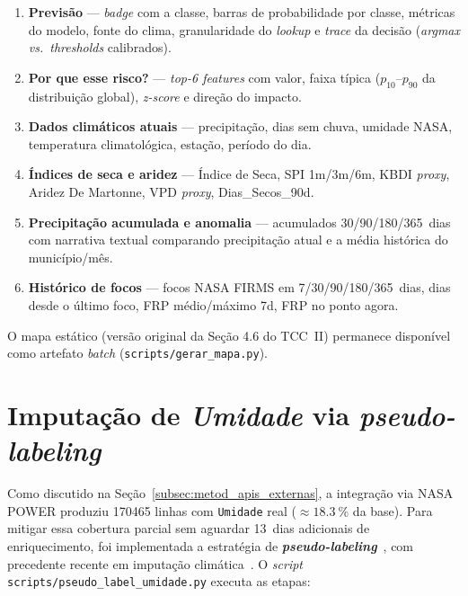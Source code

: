 \begin{enumerate}
  \item \textbf{Previsão} --- \emph{badge} com a classe, barras de probabilidade por classe, métricas do modelo, fonte do clima, granularidade do \emph{lookup} e \emph{trace} da decisão (\emph{argmax} \emph{vs.}\ \emph{thresholds} calibrados).
  \item \textbf{Por que esse risco?} --- \emph{top-6 features} com valor, faixa típica (\(p_{10}\)--\(p_{90}\) da distribuição global), \emph{z-score} e direção do impacto.
  \item \textbf{Dados climáticos atuais} --- precipitação, dias sem chuva, umidade NASA, temperatura climatológica, estação, período do dia.
  \item \textbf{Índices de seca e aridez} --- Índice de Seca, SPI 1m/3m/6m, KBDI \emph{proxy}, Aridez De Martonne, VPD \emph{proxy}, Dias\_Secos\_90d.
  \item \textbf{Precipitação acumulada e anomalia} --- acumulados 30/90/180/365~dias com narrativa textual comparando precipitação atual e a média histórica do município/mês.
  \item \textbf{Histórico de focos} --- focos NASA FIRMS em 7/30/90/180/365~dias, dias desde o último foco, FRP médio/máximo 7d, FRP no ponto agora.
\end{enumerate}

O mapa estático (versão original da Seção 4.6 do TCC~II) permanece disponível como artefato \emph{batch} (\texttt{scripts/gerar\_mapa.py}).

\section{Imputação de \emph{Umidade} via \emph{pseudo-labeling}}
\label{sec:metodologia_pseudo_label}

Como discutido na Seção~\ref{subsec:metod_apis_externas}, a integração via NASA POWER produziu \num{170465} linhas com \texttt{Umidade} real (\(\approx \SI{18,3}{\percent}\) da base). Para mitigar essa cobertura parcial sem aguardar 13~dias adicionais de enriquecimento, foi implementada a estratégia de \textbf{\emph{pseudo-labeling}}~\cite{lee2013pseudo}, com precedente recente em imputação climática~\cite{lopezgarcia2024spatiotemporal}. O \emph{script} \texttt{scripts/pseudo\_label\_umidade.py} executa as etapas:

